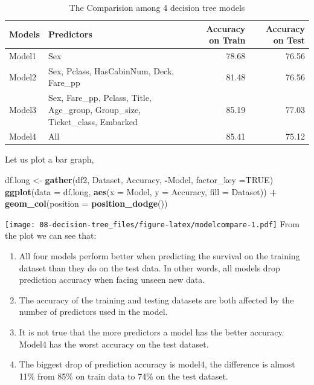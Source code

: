 \documentclass[
]{book}
\newenvironment{Shaded}{\begin{snugshade}}{\end{snugshade}}
\newcommand{\DataTypeTok}[1]{\textcolor[rgb]{0.13,0.29,0.53}{#1}}
\newcommand{\KeywordTok}[1]{\textcolor[rgb]{0.13,0.29,0.53}{\textbf{#1}}}
\newcommand{\NormalTok}[1]{#1}
\newcommand{\OperatorTok}[1]{\textcolor[rgb]{0.81,0.36,0.00}{\textbf{#1}}}
\newcommand{\OtherTok}[1]{\textcolor[rgb]{0.56,0.35,0.01}{#1}}
\newcommand{\StringTok}[1]{\textcolor[rgb]{0.31,0.60,0.02}{#1}}
\begin{document}
\begin{longtable}[t]{llrr}
\caption{\label{tab:unnamed-chunk-2}The Comparision among 4 decision tree models}\\
\toprule
Models & Predictors & Accuracy on Train & Accuracy on Test\\
\midrule
Model1 & Sex & 78.68 & 76.56\\
Model2 & Sex, Pclass, HasCabinNum, Deck, Fare\_pp & 81.48 & 76.56\\
Model3 & Sex, Fare\_pp, Pclass, Title, Age\_group, Group\_size, Ticket\_class, Embarked & 85.19 & 77.03\\
Model4 & All & 85.41 & 75.12\\
\bottomrule
\end{longtable}

Let us plot a bar graph,

\begin{Shaded}
\begin{Highlighting}[]
\NormalTok{df.long <-}\StringTok{ }\KeywordTok{gather}\NormalTok{(df2, Dataset, Accuracy, }\OperatorTok{-}\NormalTok{Model, }\DataTypeTok{factor_key =}\OtherTok{TRUE}\NormalTok{)}
\KeywordTok{ggplot}\NormalTok{(}\DataTypeTok{data =}\NormalTok{ df.long, }\KeywordTok{aes}\NormalTok{(}\DataTypeTok{x =}\NormalTok{ Model, }\DataTypeTok{y =}\NormalTok{ Accuracy, }\DataTypeTok{fill =}\NormalTok{ Dataset)) }\OperatorTok{+}
\StringTok{  }\KeywordTok{geom_col}\NormalTok{(}\DataTypeTok{position =} \KeywordTok{position_dodge}\NormalTok{()) }
\end{Highlighting}
\end{Shaded}

\texttt{[image: 08-decision-tree\_files/figure-latex/modelcompare-1.pdf]}
From the plot we can see that:

\begin{enumerate}
\def\labelenumi{\arabic{enumi}.}
\item
  All four models perform better when predicting the survival on the training dataset than they do on the test data. In other words, all models drop prediction accuracy when facing unseen new data.
\item
  The accuracy of the training and testing datasets are both affected by the number of predictors used in the model.
\item
  It is not true that the more predictors a model has the better accuracy. Model4 has the worst accuracy on the test dataset.
\item
  The biggest drop of prediction accuracy is model4, the difference is almost 11\% from 85\% on train data to 74\% on the test dataset.
\end{enumerate}
\end{document}
